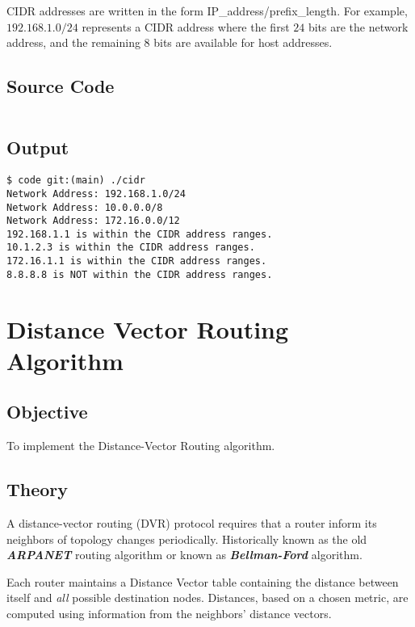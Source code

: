 \documentclass{korigamik}
\begin{document}
CIDR addresses are written in the form IP\_address/prefix\_length. For example,
$192.168.1.0/24$ represents a CIDR address where the first $24$ bits are the
network address, and the remaining 8 bits are available for host addresses.

\subsection{Source Code}

\inputminted[firstline=9, fontsize=\footnotesize]{cpp}{code/cidr.cpp}

\subsection{Output}

\begin{lstlisting}[style=output]
$ code git:(main) ./cidr
Network Address: 192.168.1.0/24
Network Address: 10.0.0.0/8
Network Address: 172.16.0.0/12
192.168.1.1 is within the CIDR address ranges.
10.1.2.3 is within the CIDR address ranges.
172.16.1.1 is within the CIDR address ranges.
8.8.8.8 is NOT within the CIDR address ranges.
\end{lstlisting}

\pagebreak

\section{Distance Vector Routing Algorithm}
\label{sec:Distance Vector Routing Algorithm}

\subsection{Objective}
To implement the Distance-Vector Routing algorithm.

\subsection{Theory}
A distance-vector routing (DVR) protocol requires that a router inform its
neighbors of topology changes periodically. Historically known as the old
\textbf{\textit{ARPANET}} routing algorithm or known as \textbf{\textit{Bellman-Ford}} algorithm.

Each router maintains a Distance Vector table containing the distance between
itself and \textit{all} possible destination nodes. Distances, based on a
chosen metric, are computed using information from the neighbors' distance
vectors.
\end{document}
